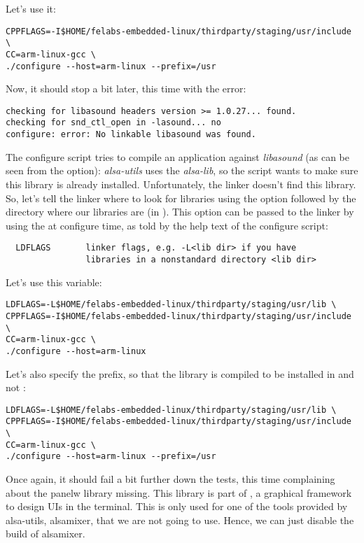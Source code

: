 Let's use it:

\begin{verbatim}
CPPFLAGS=-I$HOME/felabs-embedded-linux/thirdparty/staging/usr/include \
CC=arm-linux-gcc \
./configure --host=arm-linux --prefix=/usr
\end{verbatim}

Now, it should stop a bit later, this time with the error:
\begin{verbatim}
checking for libasound headers version >= 1.0.27... found.
checking for snd_ctl_open in -lasound... no
configure: error: No linkable libasound was found.
\end{verbatim}

The configure script tries to compile an application against {\em
  libasound} (as can be seen from the  option): {\em
  alsa-utils} uses the {\em alsa-lib}, so the \code{configure} script
wants to make sure this library is already installed. Unfortunately,
the \code{ld} linker doesn't find this library. So, let's tell the
linker where to look for libraries using the  option followed
by the directory where our libraries are (in
\code{staging/usr/lib}). This \code{-L} option can be passed to the
linker by using the \code{LDFLAGS} at configure time, as told by the
help text of the configure script:

\begin{verbatim}
  LDFLAGS       linker flags, e.g. -L<lib dir> if you have
                libraries in a nonstandard directory <lib dir>
\end{verbatim}

Let's use this  variable:

\begin{verbatim}
LDFLAGS=-L$HOME/felabs-embedded-linux/thirdparty/staging/usr/lib \
CPPFLAGS=-I$HOME/felabs-embedded-linux/thirdparty/staging/usr/include \
CC=arm-linux-gcc \
./configure --host=arm-linux
\end{verbatim}

Let's also specify the prefix, so that the library is compiled to be
installed in  and not :

\begin{verbatim}
LDFLAGS=-L$HOME/felabs-embedded-linux/thirdparty/staging/usr/lib \
CPPFLAGS=-I$HOME/felabs-embedded-linux/thirdparty/staging/usr/include \
CC=arm-linux-gcc \
./configure --host=arm-linux --prefix=/usr
\end{verbatim}

Once again, it should fail a bit further down the tests, this time
complaining about the panelw library missing. This library is part of
\code{ncurses}, a graphical framework to design UIs in the
terminal. This is only used for one of the tools provided by
alsa-utils, alsamixer, that we are not going to use. Hence, we can
just disable the build of alsamixer.

